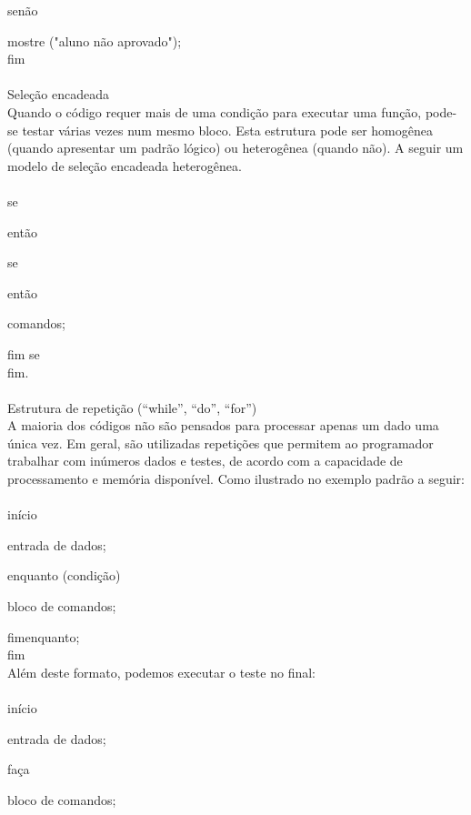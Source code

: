 \documentclass[journal]{IEEEtran}
\begin{document}
senão
\setlength{\parindent}{10ex}

mostre ("aluno não aprovado");
\\fim
\setlength{\parindent}{3ex}
\\
\\Seleção encadeada 
\\

Quando o código requer mais de uma condição para executar uma função, pode-se testar várias vezes num mesmo bloco. Esta estrutura pode ser homogênea (quando apresentar um padrão lógico) ou heterogênea (quando não). A seguir um modelo de seleção encadeada heterogênea.
\\
\\se

então
\setlength{\parindent}{7ex}

se
\setlength{\parindent}{11ex}

então
\setlength{\parindent}{15ex}

comandos;
\setlength{\parindent}{11ex}

fim se
\setlength{\parindent}{3ex}
\\fim.
\\
\\Estrutura de repetição (“while”, “do”, “for”) 
\\

A maioria dos códigos não são pensados para processar apenas um dado uma única vez. Em geral, são utilizadas repetições que permitem ao programador trabalhar com inúmeros  dados e testes, de acordo com a capacidade de processamento e memória disponível. Como ilustrado no exemplo padrão a seguir:
\\
\\início

	entrada de dados;
	
	enquanto (condição)
\setlength{\parindent}{7ex}

		bloco de comandos;
\setlength{\parindent}{3ex}		

	fimenquanto;
\\ fim
\\

Além deste formato, podemos executar o teste no final:
\\
\\início

	entrada de dados;
	
	faça
\setlength{\parindent}{7ex}

		bloco de comandos;
\setlength{\parindent}{3ex}		
\end{document}

